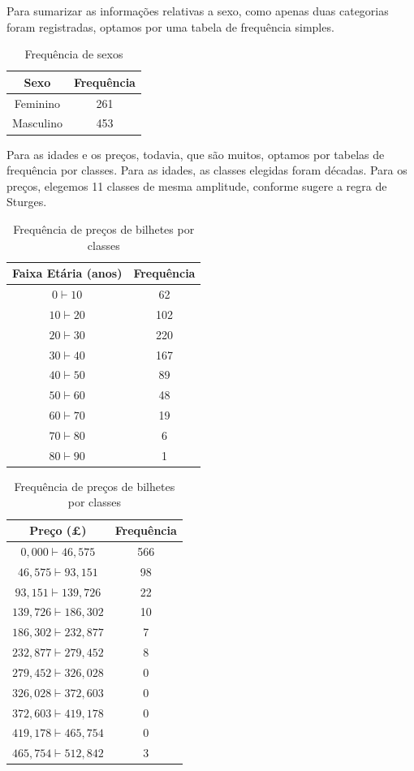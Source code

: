 \documentclass[brazil, a4paper, 11pt]{article}
\begin{document}
	Para sumarizar as informações relativas a sexo, como apenas duas categorias foram registradas, optamos por uma tabela de frequência simples.
	\begin{table}[H]
		\centering
		\caption{Frequência de sexos}
		\begin{tabular}{c|c}
			\toprule
			Sexo		& Frequência\\
			\midrule
			Feminino	& 261		\\
			Masculino	& 453		\\
			\bottomrule
		\end{tabular}
	\end{table}
	Para as idades e os preços, todavia, que são muitos, optamos por tabelas de frequência por classes. Para as idades, as classes elegidas foram décadas. Para os preços, elegemos 11 classes de mesma amplitude, conforme sugere a regra de Sturges.
	\begin{table}[H]
		\begin{minipage}[t]{0.48\textwidth}
			\centering
			\caption{Frequência de idades por década}
			\begin{tabular}{c|c}
				\toprule
				Faixa Etária (anos)& Frequência\\
				\midrule
				$0\vdash 10$	& 62		\\
				$10\vdash 20$	& 102		\\
				$20\vdash 30$	& 220		\\
				$30\vdash 40$	& 167		\\
				$40\vdash 50$	& 89		\\
				$50\vdash 60$	& 48		\\
				$60\vdash 70$	& 19		\\
				$70\vdash 80$	& 6			\\
				$80\vdash 90$	& 1			\\
				\bottomrule
			\end{tabular}
		\end{minipage}
		\hfill
		\begin{minipage}[t]{0.48\textwidth}
			\centering
			\caption{Frequência de preços de bilhetes por classes}
			\begin{tabular}{c|c}
				\toprule
				Preço (\pounds)		& Frequência\\
				\midrule
			    $  0,000\vdash 46,575$	& 566	\\
				$ 46,575\vdash 93,151$	& 98	\\
				$ 93,151\vdash 139,726$	& 22	\\
				$139,726\vdash 186,302$	& 10	\\
				$186,302\vdash 232,877$	& 7		\\
				$232,877\vdash 279,452$	& 8		\\
				$279,452\vdash 326,028$	& 0		\\
				$326,028\vdash 372,603$	& 0		\\
				$372,603\vdash 419,178$	& 0		\\
				$419,178\vdash 465,754$	& 0		\\
				$465,754\vdash 512,842$	& 3		\\
				\bottomrule
			\end{tabular}
		\end{minipage}
	\end{table}
\end{document}
